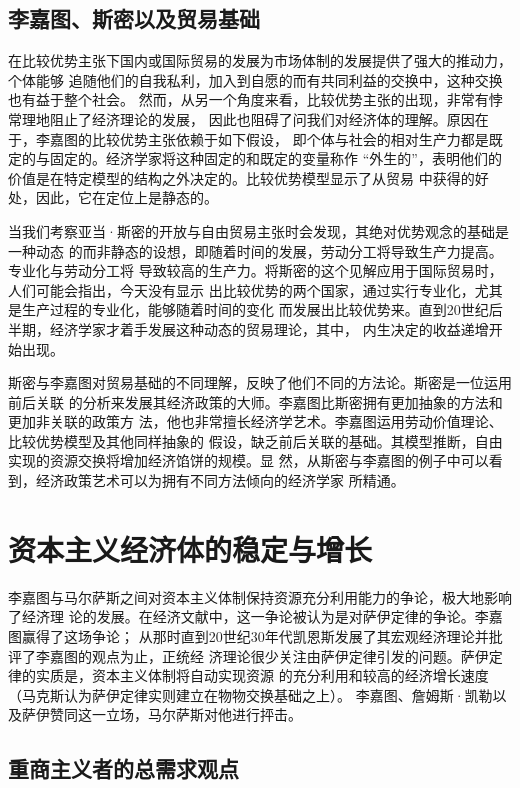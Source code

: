 \subsection{李嘉图、斯密以及贸易基础}

在比较优势主张下国内或国际贸易的发展为市场体制的发展提供了强大的推动力，个体能够
追随他们的自我私利，加入到自愿的而有共同利益的交换中，这种交换也有益于整个社会。
然而，从另一个角度来看，比较优势主张的出现，非常有悖常理地阻止了经济理论的发展，
因此也阻碍了问我们对经济体的理解。原因在于，李嘉图的比较优势主张依赖于如下假设，
即个体与社会的相对生产力都是既定的与固定的。经济学家将这种固定的和既定的变量称作
“外生的”，表明他们的价值是在特定模型的结构之外决定的。比较优势模型显示了从贸易
中获得的好处，因此，它在定位上是静态的。

当我们考察亚当·斯密的开放与自由贸易主张时会发现，其绝对优势观念的基础是一种动态
的而非静态的设想，即随着时间的发展，劳动分工将导致生产力提高。专业化与劳动分工将
导致较高的生产力。将斯密的这个见解应用于国际贸易时，人们可能会指出，今天没有显示
出比较优势的两个国家，通过实行专业化，尤其是生产过程的专业化，能够随着时间的变化
而发展出比较优势来。直到20世纪后半期，经济学家才着手发展这种动态的贸易理论，其中，
内生决定的收益递增开始出现。

斯密与李嘉图对贸易基础的不同理解，反映了他们不同的方法论。斯密是一位运用前后关联
的分析来发展其经济政策的大师。李嘉图比斯密拥有更加抽象的方法和更加非关联的政策方
法，他也非常擅长经济学艺术。李嘉图运用劳动价值理论、比较优势模型及其他同样抽象的
假设，缺乏前后关联的基础。其模型推断，自由实现的资源交换将增加经济馅饼的规模。显
然，从斯密与李嘉图的例子中可以看到，经济政策艺术可以为拥有不同方法倾向的经济学家
所精通。

\section{资本主义经济体的稳定与增长}

李嘉图与马尔萨斯之间对资本主义体制保持资源充分利用能力的争论，极大地影响了经济理
论的发展。在经济文献中，这一争论被认为是对萨伊定律的争论。李嘉图赢得了这场争论；
从那时直到20世纪30年代凯恩斯发展了其宏观经济理论并批评了李嘉图的观点为止，正统经
济理论很少关注由萨伊定律引发的问题。萨伊定律的实质是，资本主义体制将自动实现资源
的充分利用和较高的经济增长速度（马克斯认为萨伊定律实则建立在物物交换基础之上）。
李嘉图、詹姆斯·凯勒以及萨伊赞同这一立场，马尔萨斯对他进行抨击。

\subsection{重商主义者的总需求观点}

